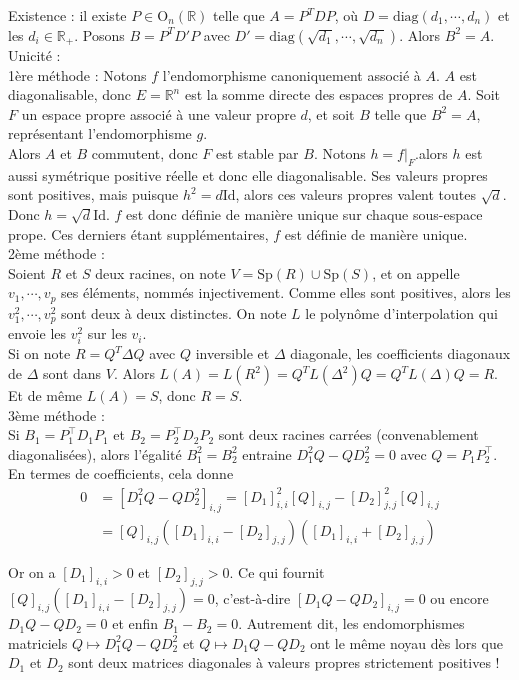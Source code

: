Existence : il existe $P\in\mathrm O_n(\mathbb{R})$ telle que $A=P^TDP$, où $D=\mathrm{diag}(d_1,\cdots,d_n)$ et les $d_i\in\mathbb{R}_+$.
Posons $B=P^TD'P$ avec $D'=\mathrm{diag}(\sqrt{d_1},\cdots,\sqrt{d_n})$. Alors $B^2=A$.\\

Unicité : \\

1ère méthode : Notons $f$ l'endomorphisme canoniquement associé à $A$. $A$ est diagonalisable,
donc $E=\mathbb{R}^n$ est la somme directe des espaces propres de $A$. Soit $F$ un
espace propre associé à une valeur propre $d$, et soit $B$ telle que $B^2=A$, représentant l'endomorphisme $g$.\\
Alors $A$ et $B$ commutent, donc $F$ est stable par $B$. Notons $h=f|_F$.alors $h$ est aussi symétrique positive réelle
et donc elle diagonalisable. Ses valeurs propres sont positives, mais puisque $h^2=d\mathrm{Id}$, alors ces valeurs
propres valent toutes $\sqrt d$. Donc $h=\sqrt d\mathrm{Id}$. $f$ est donc définie de manière unique sur chaque sous-espace
prope. Ces derniers étant supplémentaires, $f$ est définie de manière unique.\\

2ème méthode :\\

Soient $R$ et $S$ deux racines, on note $V=\mathrm{Sp}(R)\cup \mathrm{Sp}(S)$, et on appelle $v_1,\cdots,v_p$ ses éléments, nommés
injectivement. Comme elles sont positives, alors les $v_1^2,\cdots,v_p^2$ sont deux à deux distinctes. On note $L$
le polynôme d'interpolation qui envoie les $v_i^2$ sur les $v_i$.\\
Si on note $R=Q^T\Delta Q$ avec $Q$ inversible et $\Delta$ diagonale, les coefficients diagonaux de $\Delta$ sont
dans $V$. Alors $L(A)=L(R^2)=Q^T L(\Delta^2) Q=Q^T L(\Delta)Q=R$. Et de même $L(A)=S$, donc $R=S$.\\


3ème méthode :\\

Si $B_1=P_1^{\top} D_1 P_1$ et $B_2=P_2^{\top} D_2 P_2$ sont deux racines carrées (convenablement diagonalisées), alors l'égalité $B_1^2=B_2^2$ entraine $D_1^2 Q-Q D_2^2=0$ avec $Q=P_1 P_2^{\top}$. En termes de coefficients, cela donne
\begin{align*}
0&=\left[D_1^2 Q-Q D_2^2\right]_{i, j}=\left[D_1\right]_{i, i}^2[Q]_{i, j}-\left[D_2\right]_{j, j}^2[Q]_{i, j}\\
&=[Q]_{i, j}\left(\left[D_1\right]_{i, i}-\left[D_2\right]_{j, j}\right)\left(\left[D_1\right]_{i, i}+\left[D_2\right]_{j, j}\right)
\end{align*}


Or on a $\left[D_1\right]_{i, i}>0$ et $\left[D_2\right]_{j, j}>0$. Ce qui fournit $[Q]_{i, j}\left(\left[D_1\right]_{i, i}-\left[D_2\right]_{j, j}\right)=0$, c'est-à-dire $\left[D_1 Q-Q D_2\right]_{i, j}=0$ ou encore $D_1 Q-Q D_2=0$ et enfin $B_1-B_2=0$.
Autrement dit, les endomorphismes matriciels $Q \mapsto D_1^2 Q-Q D_2^2$ et $Q \mapsto D_1 Q-Q D_2$ ont le même noyau dès lors que $D_1$ et $D_2$ sont deux matrices diagonales à valeurs propres strictement positives !
